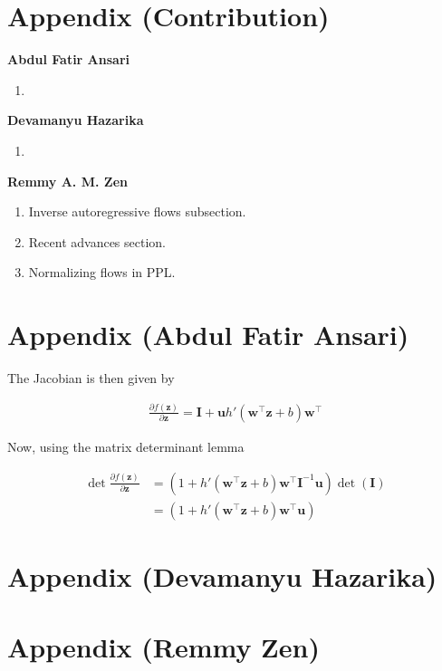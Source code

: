 \documentclass[runningheads]{llncs}
\begin{document}
\appendix


\section{Appendix (Contribution)}
\textbf{Abdul Fatir Ansari}
\begin{enumerate}
	\item 
\end{enumerate}

\textbf{Devamanyu Hazarika}
\begin{enumerate}
	\item 
\end{enumerate}


\textbf{Remmy A. M. Zen}
\begin{enumerate}
	\item Inverse autoregressive flows subsection.
	\item Recent advances section.
	\item Normalizing flows in PPL.
\end{enumerate}

\section{Appendix (Abdul Fatir Ansari)}


The Jacobian is then given by

\begin{align*}
\frac{\partial f(\mathbf{z})}{\partial \mathbf{z}} = \mathbf{I} + \mathbf{u}h'(\mathbf{w}^\top\mathbf{z} + b)\mathbf{w}^\top
\end{align*}

Now, using the matrix determinant lemma

\begin{align}
\det\frac{\partial f(\mathbf{z})}{\partial \mathbf{z}} &= (1 + h'(\mathbf{w}^\top\mathbf{z} + b)\mathbf{w}^\top\mathbf{I}^{-1}\mathbf{u})\det(\mathbf{I})\\
&=(1 + h'(\mathbf{w}^\top\mathbf{z} + b)\mathbf{w}^\top\mathbf{u})\label{eq:planar-det}
\end{align}

\section{Appendix (Devamanyu Hazarika)}
\section{Appendix (Remmy Zen)}
\end{document}

